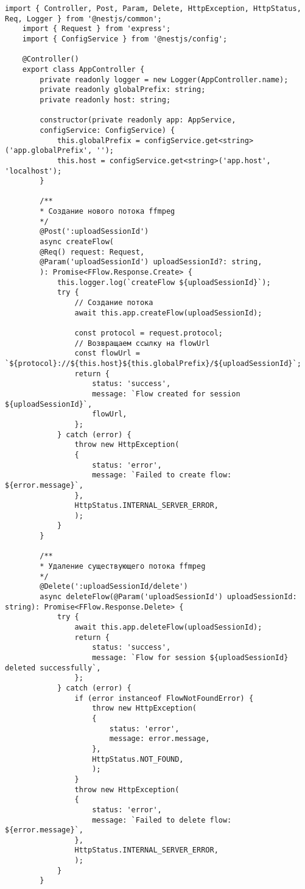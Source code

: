 \begin{lstlisting}[caption={app.controller.ts}]
	import { Controller, Post, Param, Delete, HttpException, HttpStatus, Req, Logger } from '@nestjs/common';
	import { Request } from 'express';
	import { ConfigService } from '@nestjs/config';
	
	@Controller()
	export class AppController {
		private readonly logger = new Logger(AppController.name);
		private readonly globalPrefix: string;
		private readonly host: string;
		
		constructor(private readonly app: AppService,
		configService: ConfigService) {
			this.globalPrefix = configService.get<string>('app.globalPrefix', '');
			this.host = configService.get<string>('app.host', 'localhost');
		}
		
		/**
		* Создание нового потока ffmpeg
		*/
		@Post(':uploadSessionId')
		async createFlow(
		@Req() request: Request,
		@Param('uploadSessionId') uploadSessionId?: string,
		): Promise<FFlow.Response.Create> {
			this.logger.log(`createFlow ${uploadSessionId}`);
			try {
				// Создание потока
				await this.app.createFlow(uploadSessionId);
				
				const protocol = request.protocol;
				// Возвращаем ссылку на flowUrl
				const flowUrl = `${protocol}://${this.host}${this.globalPrefix}/${uploadSessionId}`;
				return {
					status: 'success',
					message: `Flow created for session ${uploadSessionId}`,
					flowUrl,
				};
			} catch (error) {
				throw new HttpException(
				{
					status: 'error',
					message: `Failed to create flow: ${error.message}`,
				},
				HttpStatus.INTERNAL_SERVER_ERROR,
				);
			}
		}
		
		/**
		* Удаление существующего потока ffmpeg
		*/
		@Delete(':uploadSessionId/delete')
		async deleteFlow(@Param('uploadSessionId') uploadSessionId: string): Promise<FFlow.Response.Delete> {
			try {
				await this.app.deleteFlow(uploadSessionId);
				return {
					status: 'success',
					message: `Flow for session ${uploadSessionId} deleted successfully`,
				};
			} catch (error) {
				if (error instanceof FlowNotFoundError) {
					throw new HttpException(
					{
						status: 'error',
						message: error.message,
					},
					HttpStatus.NOT_FOUND,
					);
				}
				throw new HttpException(
				{
					status: 'error',
					message: `Failed to delete flow: ${error.message}`,
				},
				HttpStatus.INTERNAL_SERVER_ERROR,
				);
			}
		}
		

\end{lstlisting}
